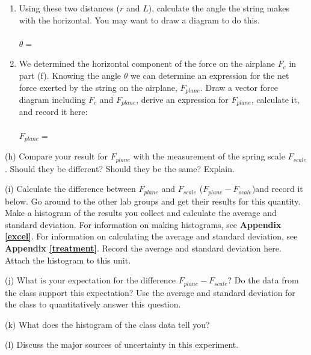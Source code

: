 \begin{enumerate}
\item Using these two distances ($r$ and $L$), 
calculate the angle the string makes with
the horizontal. You may want to draw a diagram to do this. \\
\\
\( \theta  =\)  \vspace{5mm}

\item We determined the horizontal component of the force on the airplane 
\( F_{c} \) in part (f). Knowing the angle \( \theta \) we can determine an
expression for the
net force exerted by the string on the airplane, \( F_{plane} \). Draw a vector
force diagram including \( F_{c} \) and \( F_{plane} \), derive an expression
for \( F_{plane} \), calculate it, and record it here: \\
\\
\( F_{plane} =\)  \vspace{10mm}

\end{enumerate}
(h) Compare your result for \( F_{plane} \) with the measurement of the spring
scale \( F_{scale} \). Should they be different? Should they be the same? Explain.
\vspace{15mm}


(i) Calculate the difference between \( F_{plane} \) and \( F_{scale} \) (\( F_{plane} - F_{scale} \))and record it below.
Go around to the other lab groups and get their results for this quantity.
Make a histogram of the results you collect and calculate the average and standard deviation.
For information on making histograms, see \textbf{Appendix \ref{excel}}. For information on calculating the average and
standard deviation, see \textbf{Appendix \ref{treatment}}. Record the average and standard deviation here.
Attach the histogram to this unit.
\vspace{30mm}

(j) What is your expectation for the difference \( F_{plane} - F_{scale} \)?
Do the data from the class support this expectation? 
Use the average and standard deviation for the class to quantitatively answer this question.
\vspace{20mm}

(k) What does the histogram of the class data tell you?
\vspace{20mm}

(l) Discuss the major sources of uncertainty in this experiment.
\vspace{15mm}

